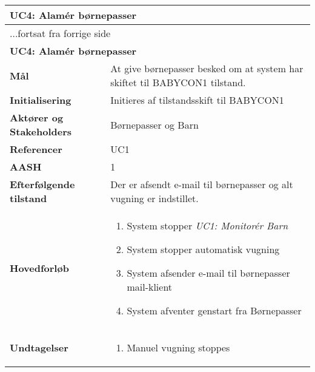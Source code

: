 \begin{center} \centering \label{kravspec:uc4}
	\begin{longtable}{|p{5cm}|p{9cm}|}  %
	\hline
		\multicolumn{2}{|l|}{\textbf{UC4: Alamér børnepasser}} \\\hline %
		\endfirsthead
		
		\multicolumn{2}{l}{...fortsat fra forrige side} \\ \hline %
		\multicolumn{2}{|l|}{\textbf{UC4: Alamér børnepasser}} \\\hline %
		\endhead	
		
		\textbf{Mål}							&At give børnepasser besked om at system har skiftet til BABYCON1 tilstand.		\\\hline
		\textbf{Initialisering}				&Initieres af tilstandsskift til BABYCON1		\\\hline
		\textbf{Aktører og Stakeholders}		&Børnepasser og Barn		\\\hline 
		\textbf{Referencer}					&UC1		\\\hline
		\textbf{AASH}						&1		\\\hline
		\textbf{Efterfølgende tilstand}		&Der er afsendt e-mail til børnepasser og alt vugning er indstillet. 		\\\hline
		\textbf{Hovedforløb}					
			&\begin{enumerate}
				
				\item System stopper \textit{UC1: Monitorér Barn}
				\item \label{kravspec:uc4_autovugning}System stopper automatisk vugning
				\newline [Und: \ref{kravspec:uc4_autovugning}.a Manuel vugning stoppes] 				
				
				\item \label{kravspec:uc4_emailafsend}System afsender e-mail til børnepasser mail-klient
				\newline [Und: \ref{kravspec:uc4_emailafsend}.a E-mail kunne ikke afsendes] 
				\item System afventer genstart fra Børnepasser
				
			\end{enumerate}
		\\\hline
		\textbf{Undtagelser}
			&\begin{enumerate}[label=\ref{kravspec:uc4_autovugning}.a]
			\item Manuel vugning stoppes
					\begin{itemize}
					

\end{itemize}
\end{enumerate}
\end{longtable}
\end{center}
